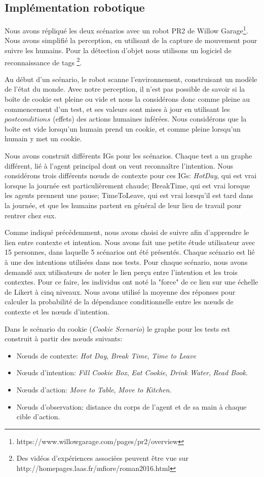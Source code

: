 \documentclass[a4paper,11pt,twoside]{StyleThese}
\begin{document}
\subsection{Implémentation robotique}
\label{sec:expeRobotIntent}
Nous avons répliqué les deux scénarios avec un robot PR2 de Willow Garage\footnote{https://www.willowgarage.com/pages/pr2/overview}. Nous avons simplifié la perception, en utilisant de la capture de mouvement pour suivre les humains. Pour la détection d'objet nous utilisons un logiciel de reconnaissance de tags \footnote{Des vidéos d'expériences associées peuvent être vue sur  http://homepages.laas.fr/mfiore/roman2016.html}. 

Au début d'un scénario, le robot scanne l'environnement, construisant un modèle de l'état du monde. Avec notre perception, il n'est pas possible de savoir si la boîte de cookie est pleine ou vide et nous la considérons donc comme pleine au commencement d'un test, et ses valeurs sont mises à jour en utilisant les $postconditions$ (effets) des actions humaines inférées. Nous considérons que la boîte est vide lorsqu'un humain prend un cookie, et comme pleine lorsqu'un humain y met un cookie.

Nous avons construit différents IGs pour les scénarios. Chaque test a un graphe différent, lié à l'agent principal dont on veut reconnaître l'intention. Nous considérons trois différents nœuds de contexte pour ces IGs: \textit{HotDay}, qui est vrai lorsque la journée est particulièrement chaude; BreakTime, qui est vrai lorsque les agents prennent une pause; TimeToLeave, qui est vrai lorsqu'il est tard dans la journée, et que les humains partent en général de leur lieu de travail pour rentrer chez eux.

Comme indiqué précédemment, nous avons choisi de suivre \cite{Liu2014} afin d'apprendre le lien entre contexte et intention. Nous avons fait une petite étude utilisateur avec 15 personnes, dans laquelle 5 scénarios ont été présentés. Chaque scénario est lié à une des intentions utilisées dans nos tests. Pour chaque scénario, nous avons demandé aux utilisateurs de noter le lien perçu entre l'intention et les trois contextes. Pour ce faire, les individus ont noté la "force" de ce lien sur une échelle de Likert à cinq niveaux. Nous avons utilisé la moyenne des réponses pour calculer la probabilité de la dépendance conditionnelle entre les nœuds de contexte et les nœuds d'intention.


Dans le scénario  du cookie (\textit{Cookie Scenario}) le graphe pour les tests est construit à partir des nœuds suivants:
\begin{itemize}
\item Nœuds de contexte: \textit{Hot Day}, \textit{Break Time}, \textit{Time to Leave}
\item Nœuds d'intention: \textit{Fill Cookie Box}, \textit{Eat Cookie}, \textit{Drink Water}, \textit{Read Book}.
\item Nœuds d'action: \textit{Move to Table}, \textit{Move to Kitchen}.
\item Nœuds d'observation: distance du corps de l'agent et de sa main à chaque cible d'action.
\end{itemize}
\end{document}

